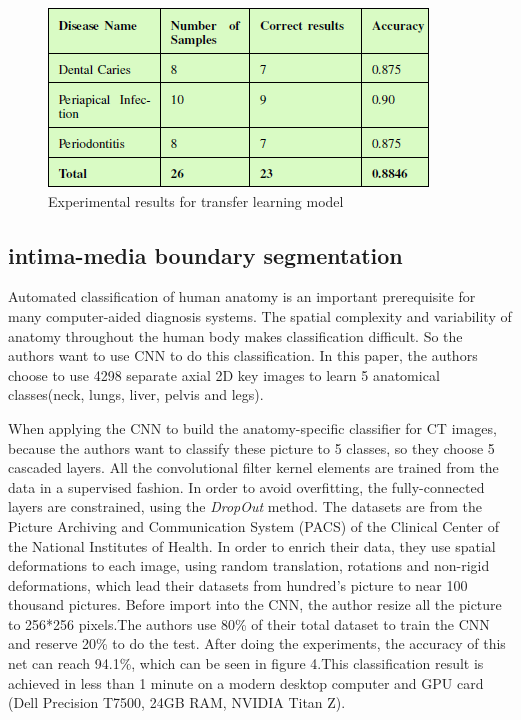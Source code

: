 \documentclass[10pt,twocolumn,letterpaper]{article}
\begin{document}
\begin{figure}[t]
	\begin{center}
		\includegraphics[width=0.8\linewidth]{3}
	\end{center}
	\caption{Experimental results for transfer learning model} 
	\label{fig:long}
	\label{fig:onecol}
\end{figure}

\subsection{intima-media boundary segmentation}

Automated classification of human anatomy is an important prerequisite for many computer-aided diagnosis systems. The spatial complexity and variability of anatomy throughout the human body makes classification difficult. So the authors want to use CNN to do this classification. In this paper, the authors choose to use 4298 separate axial 2D key images to learn 5 anatomical classes(neck, lungs, liver, pelvis and legs)\cite{roth2015anatomy}.

When applying the CNN to build the anatomy-specific classifier for CT images, because the authors want to classify these picture to 5 classes, so they choose 5 cascaded layers. All the convolutional filter kernel elements are trained from the data in a supervised fashion. In order to avoid overfitting, the fully-connected layers are constrained, using the \textit{DropOut} method. The datasets are from the Picture Archiving and Communication System (PACS) of the Clinical Center of the National Institutes of Health. In order to enrich their data, they use spatial deformations to each image, using random translation, rotations and non-rigid deformations, which lead their datasets from hundred's picture to near 100 thousand pictures. Before import into the CNN, the author resize all the picture to 256*256 pixels.The authors use 80\% of their total dataset to train the CNN and reserve 20\% to do the test. After doing the experiments, the accuracy of this net can reach 94.1\%, which can be seen in figure 4.This classification
result is achieved in less than 1 minute on a modern desktop computer and GPU card (Dell Precision T7500,
24GB RAM, NVIDIA Titan Z).
\end{document}
